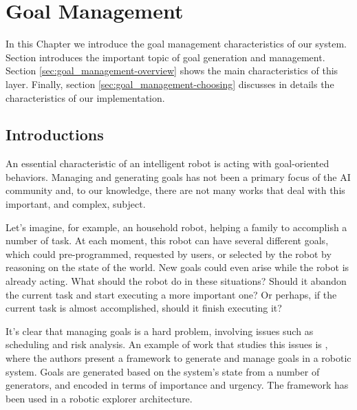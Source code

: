 
\chapter{Goal Management} %

\label{chapter-goal_management} %

In this Chapter we introduce the goal management characteristics of our system. Section  introduces the important topic of goal generation and management. Section \ref{sec:goal_management-overview} shows the main characteristics of this layer. Finally, section \ref{sec:goal_management-choosing} discusses in details the characteristics of our implementation.

\section{Introductions}
\label{sec:goal_management-intro}
An essential characteristic of an intelligent robot is acting with goal-oriented behaviors. Managing and generating goals has not been a primary focus of the AI community and, to our knowledge, there are not many works that deal with this important, and complex, subject. 

Let's imagine, for example, an household robot, helping a family to accomplish a number of task. At each moment, this robot can have several different goals, which could pre-programmed, requested by users, or selected by the robot by reasoning on the state of the world. New goals could even arise while the robot is already acting. What should the robot do in these situations? Should it abandon the current task and start executing a more important one? Or perhaps, if the current task is almost accomplished, should it finish executing it?  

It's clear that managing goals is a hard problem, involving issues such as scheduling and risk analysis. An example of work that studies this issues is \cite{hanheide2010framework}, where the authors present a framework to generate and manage goals in a robotic system. Goals are generated based on the system's state from a number of generators, and encoded in terms of importance and urgency. The framework has been used in a robotic explorer architecture.

